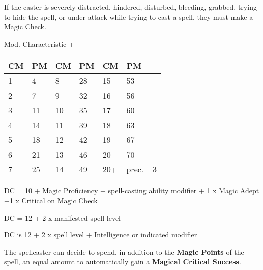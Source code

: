 \documentclass[landscape,10pt,a4paper]{article}
\begin{document}
\begin{multicols}{2}
\begin{dmbox}[title=Distracted - page \pageref{magiedistratto}]
If the caster is severely distracted, hindered, disturbed, bleeding, grabbed, trying to hide the spell, or under attack while trying to cast a spell, they must make a Magic Check.
\end{dmbox}


\begin{dmbox}[title=Magic Points - page \pageref{magiepuntimagia}]

Mod. Characteristic + \\

\noindent\begin{tabularx}{0.45\textwidth}{XX|XX|XX}
\textbf{CM} & \textbf{PM}&\textbf{CM} & \textbf{PM}&\textbf{CM} & \textbf{PM}\\
\hline
\hline
1&	4  &	8&	28&	15&	53\\
2&	7  &	9&	32&	16&	56\\
3&	11 &	10&	35&	17&	60\\
4&	14 &	11&	39&	18&	63\\
5&	18 &	12&	42&	19&	67\\
6&	21 &	13&	46&	20&	70\\
7&	25 & 	14&	49&	20+&	prec.+ 3
\end{tabularx}

\end{dmbox}


\begin{dmbox}[title=Spell Saving Throw - page \pageref{magiesavingthrows}]
DC = 10 + Magic Proficiency + spell-casting ability modifier + 1 x Magic Adept +1 x Critical on Magic Check
\end{dmbox}


\begin{dmbox}[title=Saving Throw for Magic from Objects - page \pageref{saving throws from items}]
DC = 12 + 2 x manifested spell level
\end{dmbox}

\begin{dmbox}[title=Monster Spell Saving Throw - page \pageref{tirosalvezzainccmostro}]
DC is 12 + 2 x spell level + Intelligence or indicated modifier
\end{dmbox}

\begin{dmbox}[title=Auto Magical Critical Success - page \pageref{magienova}]
The spellcaster can decide to spend, in addition to the \textbf{Magic Points} of the spell, an equal amount to automatically gain a \textbf{Magical Critical Success}.


\end{dmbox}
\end{multicols}
\end{document}
